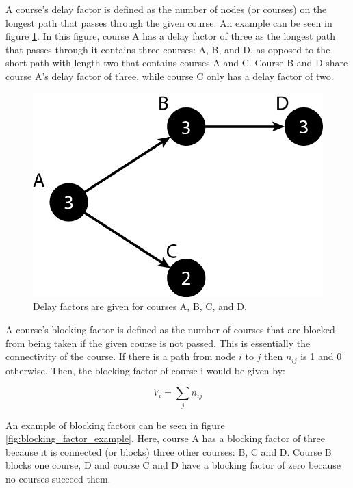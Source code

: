 \documentclass[botnum, fleqn]{unmeethesis}
\begin{document}
    A course's delay factor is defined as the number of nodes (or courses) on the longest path that passes through the given course. An example can be seen in figure \ref{fig:delay_factor_example}. In this figure, course A has a delay factor of three as the longest path that passes through it contains three courses: A, B, and D, as opposed to the short path with length two that contains courses A and C. Course B and D share course A's delay factor of three, while course C only has a delay factor of two.

    \begin{figure}[h!]
      \centerline{\includegraphics[scale=0.4]{./figures/delay_factor.png}}
      \caption{Delay factors are given for courses A, B, C, and D.} 
      \label{fig:delay_factor_example}
    \end{figure}

    A course's blocking factor is defined as the number of courses that are blocked from being taken if the given course is not passed. This is essentially the connectivity of the course. If there is a path from node \(i\) to \(j\) then \(n_{ij}\) is 1 and 0 otherwise. Then, the blocking factor of course i would be given by:

    \begin{equation}
      V_{i} = \sum_{j} n_{ij}
    \end{equation}

    An example of blocking factors can be seen in figure \ref{fig:blocking_factor_example}. Here, course A has a blocking factor of three because it is connected (or blocks) three other courses: B, C and D. Course B blocks one course, D and course C and D have a blocking factor of zero because no courses succeed them.
\end{document}
